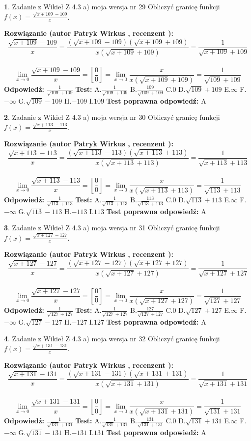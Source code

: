 \documentclass[12pt, a4paper]{article}
\theoremstyle{definition} %
\newtheorem{zad}{}
\newcommand{\zadStart}[1]{\begin{zad}#1\newline}
\newcommand{\zadStop}{\end{zad}}
\newcommand{\rozwStart}[2]{\noindent \textbf{Rozwiązanie (autor #1 , recenzent #2): }\newline}
\newcommand{\rozwStop}{\newline}
\newcommand{\odpStart}{\noindent \textbf{Odpowiedź:}\newline}
\newcommand{\odpStop}{\newline}
\newcommand{\testStart}{\noindent \textbf{Test:}\newline}
\newcommand{\testStop}{\newline}
\newcommand{\kluczStart}{\noindent \textbf{Test poprawna odpowiedź:}\newline}
\newcommand{\kluczStop}{\newline}
\begin{document}
\zadStart{Zadanie z Wikieł Z 4.3 a) moja wersja nr 29}
Obliczyć granicę funkcji $f(x)=\frac{\sqrt{x+109}-109}{x}$.
\zadStop
\rozwStart{Patryk Wirkus}{}
$$\frac{\sqrt{x+109}-109}{x}=\frac{(\sqrt{x+109}-109)(\sqrt{x+109}+109)}{x(\sqrt{x+109}+109)}=\frac{1}{\sqrt{x+109}+109}$$
\\
$$\lim\limits_{x\to0}\frac{\sqrt{x+109}-109}{x}=[\frac{0}{0}]=
\lim\limits_{x\to0}\frac{x}{x(\sqrt{x+109}+109)} = \frac{1}{\sqrt{109}+109}$$
\rozwStop
\odpStart
$\frac{1}{\sqrt{109}+109}$
\odpStop
\testStart
A.$\frac{1}{\sqrt{109}+109}$
B.$\frac{109}{\sqrt{109}+109}$
C.$0$
D.$\sqrt{109}+109$
E.$\infty$
F.$-\infty$
G.$\sqrt{109}-109$
H.$-109$
I.$109$
\testStop
\kluczStart
A
\kluczStop



\zadStart{Zadanie z Wikieł Z 4.3 a) moja wersja nr 30}
Obliczyć granicę funkcji $f(x)=\frac{\sqrt{x+113}-113}{x}$.
\zadStop
\rozwStart{Patryk Wirkus}{}
$$\frac{\sqrt{x+113}-113}{x}=\frac{(\sqrt{x+113}-113)(\sqrt{x+113}+113)}{x(\sqrt{x+113}+113)}=\frac{1}{\sqrt{x+113}+113}$$
\\
$$\lim\limits_{x\to0}\frac{\sqrt{x+113}-113}{x}=[\frac{0}{0}]=
\lim\limits_{x\to0}\frac{x}{x(\sqrt{x+113}+113)} = \frac{1}{\sqrt{113}+113}$$
\rozwStop
\odpStart
$\frac{1}{\sqrt{113}+113}$
\odpStop
\testStart
A.$\frac{1}{\sqrt{113}+113}$
B.$\frac{113}{\sqrt{113}+113}$
C.$0$
D.$\sqrt{113}+113$
E.$\infty$
F.$-\infty$
G.$\sqrt{113}-113$
H.$-113$
I.$113$
\testStop
\kluczStart
A
\kluczStop



\zadStart{Zadanie z Wikieł Z 4.3 a) moja wersja nr 31}
Obliczyć granicę funkcji $f(x)=\frac{\sqrt{x+127}-127}{x}$.
\zadStop
\rozwStart{Patryk Wirkus}{}
$$\frac{\sqrt{x+127}-127}{x}=\frac{(\sqrt{x+127}-127)(\sqrt{x+127}+127)}{x(\sqrt{x+127}+127)}=\frac{1}{\sqrt{x+127}+127}$$
\\
$$\lim\limits_{x\to0}\frac{\sqrt{x+127}-127}{x}=[\frac{0}{0}]=
\lim\limits_{x\to0}\frac{x}{x(\sqrt{x+127}+127)} = \frac{1}{\sqrt{127}+127}$$
\rozwStop
\odpStart
$\frac{1}{\sqrt{127}+127}$
\odpStop
\testStart
A.$\frac{1}{\sqrt{127}+127}$
B.$\frac{127}{\sqrt{127}+127}$
C.$0$
D.$\sqrt{127}+127$
E.$\infty$
F.$-\infty$
G.$\sqrt{127}-127$
H.$-127$
I.$127$
\testStop
\kluczStart
A
\kluczStop



\zadStart{Zadanie z Wikieł Z 4.3 a) moja wersja nr 32}
Obliczyć granicę funkcji $f(x)=\frac{\sqrt{x+131}-131}{x}$.
\zadStop
\rozwStart{Patryk Wirkus}{}
$$\frac{\sqrt{x+131}-131}{x}=\frac{(\sqrt{x+131}-131)(\sqrt{x+131}+131)}{x(\sqrt{x+131}+131)}=\frac{1}{\sqrt{x+131}+131}$$
\\
$$\lim\limits_{x\to0}\frac{\sqrt{x+131}-131}{x}=[\frac{0}{0}]=
\lim\limits_{x\to0}\frac{x}{x(\sqrt{x+131}+131)} = \frac{1}{\sqrt{131}+131}$$
\rozwStop
\odpStart
$\frac{1}{\sqrt{131}+131}$
\odpStop
\testStart
A.$\frac{1}{\sqrt{131}+131}$
B.$\frac{131}{\sqrt{131}+131}$
C.$0$
D.$\sqrt{131}+131$
E.$\infty$
F.$-\infty$
G.$\sqrt{131}-131$
H.$-131$
I.$131$
\testStop
\kluczStart
A
\kluczStop
\end{document}
